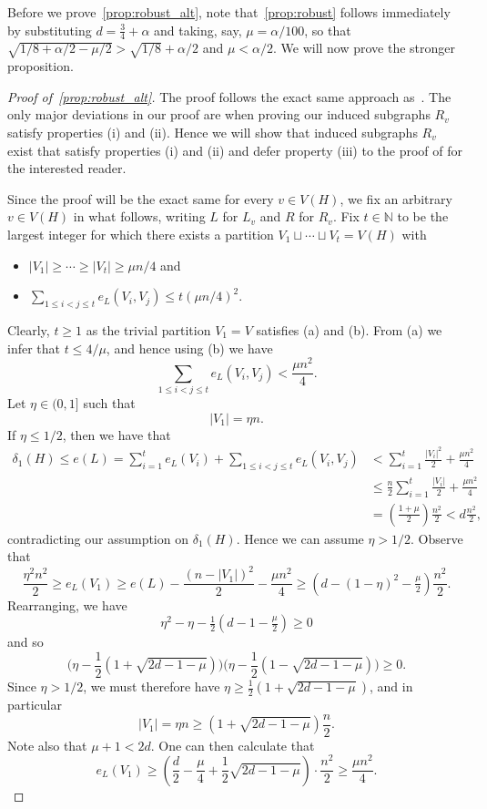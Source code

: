 \documentclass[A4paper,12pt]{article}
\theoremstyle{definition}
\begin{document}
Before we prove~\cref{prop:robust_alt}, note that~\cref{prop:robust} follows immediately by substituting $d = \frac{3}{4} + \alpha$ and  taking, say, $\mu = \alpha/100$, so that  $ \sqrt{1/8 + \alpha/2 - \mu/2} > \sqrt{1/8}+\alpha/2$ and $\mu < \alpha/2$.
We will now prove the stronger proposition.
\begin{proof}[Proof of~\cref{prop:robust_alt}]
The proof follows the exact same approach as~\cite[Prop.~2.3]{3hamcycle}. The only major deviations in our proof are when proving our induced subgraphs $R_v$ satisfy properties (i) and (ii). Hence we will show that induced subgraphs $R_v$ exist that satisfy properties (i) and (ii) and defer property (iii) to the proof of \cite[Prop.~2.3]{3hamcycle} for the interested reader.

    Since the proof will be the exact same for every $v \in V(H)$, we fix an arbitrary $v \in V(H)$ in what follows, writing $L$ for $L_v$ and  $R$ for $R_v$. 
  Fix $t \in \mathbb{N}$ to be the largest integer for which there exists a partition $V_1 \sqcup \cdots \sqcup V_t = V(H)$ with \begin{itemize}
        \item[(a)] $|V_1| \geq \cdots \geq |V_t| \geq \mu n/4$ and 
        \item[(b)]  $\sum_{1 \leq i < j \leq t}e_L(V_i, V_j) \leq t\left(\mu n/4\right)^2$.
    \end{itemize} 
    Clearly, $t \geq 1$ as the trivial partition $V_1 = V$ satisfies (a) and (b). 
    From (a) we infer that $t \leq 4/\mu$, and hence using (b) we have $$\sum_{1 \leq i < j \leq t} e_L(V_i, V_j) < \frac{\mu n^2}{4}.$$ 
    Let $\eta \in (0, 1]$ such that $$|V_1| = \eta n.$$ If $\eta \leq 1/2$, then we have that \begin{align*}
        \delta_1(H) \leq e(L) = \sum_{i=1}^t e_L(V_i) + \sum_{1 \leq i < j \leq t} e_L(V_i, V_j)  
        & <  \sum_{i=1}^t \frac{|V_i|^2}{2} + \frac{\mu n^2}{4} 
        \\& \leq \frac{n}{2}\sum_{i=1}^t\frac{|V_i|}{2} +\frac{\mu n^2}{4} 
       \\ &= \left(\frac{1+\mu}{2}  \right)\frac{n^2}{2} < d\frac{n^2}{2}, 
    \end{align*} contradicting our assumption on $\delta_1(H)$. Hence we can assume $\eta > 1/2$. Observe that $$\frac{\eta^2n^2}{2} \geq e_L(V_1) \ge e(L) - \frac{(n - |V_1|)^2}{2} - \frac{\mu n^2}{4} \geq \left(d - (1 - \eta)^2 - \tfrac{\mu}{2}\right)\frac{n^2}{2}.$$
    Rearranging, we have 
    \[ \eta^2 - \eta -\tfrac{1}{2}\left(d-1-\tfrac{\mu}{2}\right) \ge 0\]
    and so
    $$\Bigg(\eta - \frac{1}{2}\left(1+\sqrt{2d-1-\mu}\right)\Bigg)\Bigg(\eta   - \frac{1}{2}\left(1-\sqrt{2d-1-\mu}\right)\Bigg) \geq 0.$$ 
 Since $\eta > 1/2$, we must therefore have $\eta \ge \frac{1}{2}\left(1+\sqrt{2d-1-\mu}\right)$, and in particular \[|V_1| = \eta n \geq \left(1+\sqrt{2d-1-\mu}\right)\frac{n}{2}.\]
 Note also that $\mu + 1< 2d$. One can then calculate that  \[
 e_L(V_1) \ge \left(\frac{d}{2} - \frac{\mu}{4} + \frac{1}{2}\sqrt{2d - 1 - \mu}\right)\cdot\frac{n^2}{2} \ge \frac{\mu n^2}{4}.\]
 

\end{proof}
\end{document}
